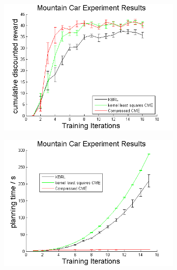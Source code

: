 \documentclass[letterpaper]{article}
\begin{document}
\begin{figure}[htb]
\centering
\begin{subfigure}[b]{0.3\textwidth}
\includegraphics[width=\textwidth]{MCrewards.png}
\end{subfigure}
\begin{subfigure}[b]{0.3\textwidth}
\includegraphics[width=\textwidth]{MCplanning.png}
\end{subfigure}
\begin{subfigure}[b]{0.3\textwidth}

\end{subfigure}
\end{figure}
\end{document}
